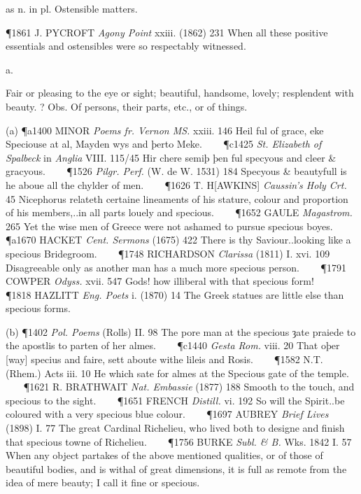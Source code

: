 \begin{description}[wide, labelwidth=!, labelindent=0pt]
\begin{myenumerate}
 as n. in pl. Ostensible matters.

\P 1861 J. PYCROFT  \textit{Agony Point} xxiii. (1862) 231 When all these positive essentials and ostensibles were so respectably witnessed.
\end{myenumerate}


 a.

\noindent {}

\vspace{-0.3cm}

\begin{myenumerate}

 Fair or pleasing to the eye or sight; beautiful, handsome, lovely; resplendent with beauty. ? Obs.  Of persons, their parts, etc., or of things.

(a) \P a1400 MINOR  \textit{Poems fr. Vernon MS.} xxiii. 146 Heil ful of grace, eke Speciouse at al, Mayden wys and þerto Meke.    
\P c1425 \textit{St. Elizabeth  of Spalbeck} in \textit{Anglia} VIII. 115/45 Hir chere semiþ þen ful specyous and cleer \& gracyous.    
\P 1526  \textit{Pilgr. Perf.} (W. de W. 1531) 184 Specyous \& beautyfull is he aboue all the chylder of men.    
\P 1626 T. H[AWKINS]  \textit{Caussin's Holy Crt.} 45 Nicephorus relateth certaine lineaments of his stature, colour and proportion of his members,..in all parts louely and specious.    
\P 1652 GAULE  \textit{Magastrom.} 265 Yet the wise men of Greece were not ashamed to pursue specious boyes.    
\P a1670 HACKET  \textit{Cent. Sermons} (1675) 422 There is thy Saviour..looking like a specious Bridegroom.    
\P 1748 RICHARDSON  \textit{Clarissa} (1811) I. xvi. 109 Disagreeable only as another man has a much more specious person.    
\P 1791 COWPER  \textit{Odyss.} xvii. 547 Gods! how illiberal with that specious form!    
\P 1818 HAZLITT  \textit{Eng. Poets} i. (1870) 14 The Greek statues are little else than specious forms.

(b) \P 1402  \textit{Pol. Poems} (Rolls) II. 98 The pore man at the specious ȝate praiede to the apostlis to parten of her almes.    
\P c1440  \textit{Gesta Rom.} viii. 20 That oþer [way] specius and faire, sett aboute withe lileis and Rosis.    
\P 1582 N.T. (Rhem.) Acts iii. 10 He which sate for almes at the Specious gate of the temple.    
\P 1621 R. BRATHWAIT  \textit{Nat. Embassie} (1877) 188 Smooth to the touch, and specious to the sight.    
\P 1651 FRENCH  \textit{Distill.} vi. 192 So will the Spirit..be coloured with a very specious blue colour.    
\P 1697 AUBREY  \textit{Brief Lives} (1898) I. 77 The great Cardinal Richelieu, who lived both to designe and finish that specious towne of Richelieu.    
\P 1756 BURKE  \textit{Subl. \& B.} Wks. 1842 I. 57 When  any object partakes of the above mentioned qualities, or of those of beautiful bodies, and is withal of great dimensions, it is full as remote from the idea of mere beauty; I call it fine or specious.


\end{myenumerate}
\end{description}
